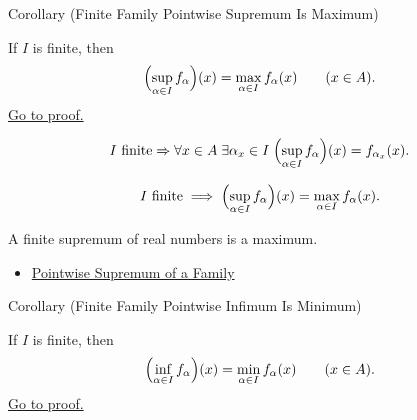 \begin{corollarybox}{Corollary (Finite Family Pointwise Supremum Is Maximum)}
\begin{corollary}
\label{cor:finite-family-pointwise-supremum-is-maximum}
If \(I\) is finite, then
\[
  \Bigl(\sup_{\alpha\in I}f_\alpha\Bigr)(x)=\max_{\alpha\in I} f_\alpha(x)
  \qquad (x\in A).
\]
\hyperref[prf:finite-family-pointwise-supremum-is-maximum]{Go to proof.}
\end{corollary}
\end{corollarybox}

\begin{remark*}
\[
  I\text{ finite}\Rightarrow
  \forall x\in A\;\exists\alpha_x\in I\;
  \Bigl(\sup_{\alpha\in I}f_\alpha\Bigr)(x)=f_{\alpha_x}(x).
\]
\end{remark*}

\begin{remark*}
\[
  I\text{ finite}
  \;\Longrightarrow\;
  \Bigl(\sup_{\alpha\in I}f_\alpha\Bigr)(x)
  =
  \max_{\alpha\in I}f_\alpha(x).
\]
\end{remark*}

\begin{remark*}[Interpretation]
A finite supremum of real numbers is a maximum.
\end{remark*}

\begin{dependencies}
\begin{itemize}
  \item \hyperref[def:pointwise-supremum-family]{Pointwise Supremum of a Family}
\end{itemize}
\end{dependencies}

\begin{corollarybox}{Corollary (Finite Family Pointwise Infimum Is Minimum)}
\begin{corollary}
\label{cor:finite-family-pointwise-infimum-is-minimum}
If \(I\) is finite, then
\[
  \Bigl(\inf_{\alpha\in I}f_\alpha\Bigr)(x)=\min_{\alpha\in I} f_\alpha(x)
  \qquad (x\in A).
\]
\hyperref[prf:finite-family-pointwise-infimum-is-minimum]{Go to proof.}
\end{corollary}
\end{corollarybox}

